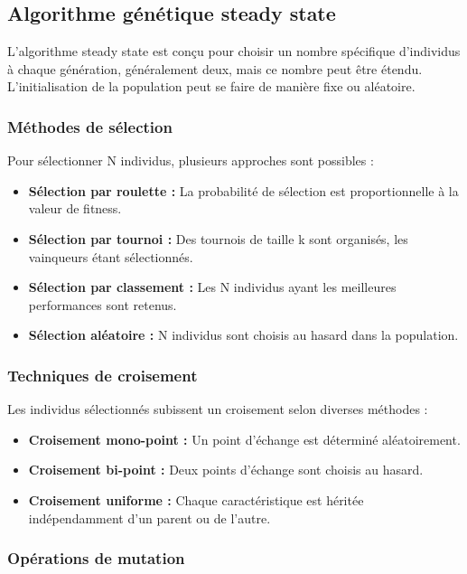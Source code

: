 \documentclass{article}
\begin{document}
\subsection{Algorithme génétique steady state}
L'algorithme steady state est conçu pour choisir un nombre spécifique d'individus à chaque génération, généralement deux, mais ce nombre peut être étendu. L'initialisation de la population peut se faire de manière fixe ou aléatoire.

\subsubsection{Méthodes de sélection}

Pour sélectionner N individus, plusieurs approches sont possibles :

\begin{itemize}
    \item \textbf{Sélection par roulette :} La probabilité de sélection est proportionnelle à la valeur de fitness.
    \item \textbf{Sélection par tournoi :} Des tournois de taille k sont organisés, les vainqueurs étant sélectionnés.
    \item \textbf{Sélection par classement :} Les N individus ayant les meilleures performances sont retenus.
    \item \textbf{Sélection aléatoire :} N individus sont choisis au hasard dans la population.
\end{itemize}

\subsubsection{Techniques de croisement}

Les individus sélectionnés subissent un croisement selon diverses méthodes :

\begin{itemize}
    \item \textbf{Croisement mono-point :} Un point d'échange est déterminé aléatoirement.
    \item \textbf{Croisement bi-point :} Deux points d'échange sont choisis au hasard.
    \item \textbf{Croisement uniforme :} Chaque caractéristique est héritée indépendamment d'un parent ou de l'autre.
\end{itemize}

\subsubsection{Opérations de mutation}
\end{document}
